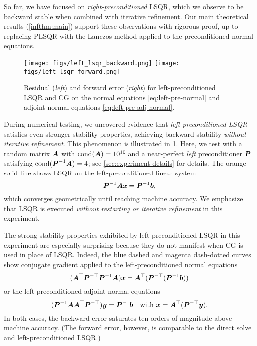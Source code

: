 \documentclass[onefignum,onetabnum,pagebackref,dvipsnames]{siamart220329}
\begin{document}
So far, we have focused on \emph{right-preconditioned} LSQR, which we observe to be backward stable when combined with iterative refinement.
Our main theoretical results (\cref{infthm:main}) support these observations with rigorous proof, up to replacing PLSQR with the Lanczos method applied to the preconditioned normal equations.

\begin{figure}
    \centering
    \texttt{[image: figs/left\_lsqr\_backward.png]}
    \texttt{[image: figs/left\_lsqr\_forward.png]}
    
    \caption{Residual (\emph{left}) and forward error (\emph{right}) for left-preconditioned LSQR and CG on the normal equations \cref{eq:left-pre-normal} and adjoint normal equations \cref{eq:left-pre-adj-normal}.}
    \label{fig:left-lsqr}
\end{figure}

During numerical testing, we uncovered evidence that \emph{left-preconditioned LSQR} satisfies even stronger stability properties, achieving backward stability \emph{without iterative refinement}.
This phenomenon is illustrated in \cref{fig:left-lsqr}.
Here, we test with a random matrix $\boldsymbol{A}$ with $\operatorname{cond}(\boldsymbol{A}) = 10^{10}$ and a near-perfect \emph{left} preconditioner $\boldsymbol{P}$ satisfying $\operatorname{cond}(\boldsymbol{P}^{-1}\boldsymbol{A}) = 4$; see \cref{sec:experiment-details} for details.
The orange solid line shows LSQR on the left-preconditioned linear system
%
\begin{equation*}
    \boldsymbol{P}^{-1}\boldsymbol{A}\boldsymbol{x} = \boldsymbol{P}^{-1}\boldsymbol{b},
\end{equation*}
%
which converges geometrically until reaching machine accuracy.
We emphasize that LSQR is executed \emph{without restarting or iterative refinement} in this experiment.

The strong stability properties exhibited by left-preconditioned LSQR in this experiment are especially surprising because they do not manifest when CG is used in place of LSQR.
Indeed, the blue dashed and magenta dash-dotted curves show conjugate gradient applied to the left-preconditioned normal equations
%
\begin{equation} \label{eq:left-pre-normal}
    (\boldsymbol{A}^\top\boldsymbol{P}^{-\top}\boldsymbol{P}^{-1}\boldsymbol{A})\boldsymbol{x} = \boldsymbol{A}^\top(\boldsymbol{P}^{-\top}(\boldsymbol{P}^{-1}\boldsymbol{b}))
\end{equation}
%
or the left-preconditioned adjoint normal equations
%
\begin{equation} \label{eq:left-pre-adj-normal}
    (\boldsymbol{P}^{-1}\boldsymbol{A}\boldsymbol{A}^\top\boldsymbol{P}^{-\top})\boldsymbol{y} = \boldsymbol{P}^{-1}\boldsymbol{b} \quad \text{with } \boldsymbol{x} = \boldsymbol{A}^\top(\boldsymbol{P}^{-\top}\boldsymbol{y}).
\end{equation}
%
In both cases, the backward error saturates ten orders of magnitude above machine accuracy.
(The forward error, however, is comparable to the direct solve and left-preconditioned LSQR.)
\end{document}

